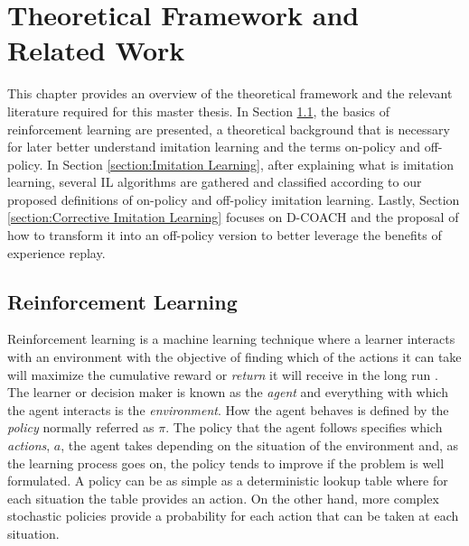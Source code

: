 \chapter{Theoretical Framework and Related Work}
\label{chapter:Theoretical Framework and Related Work}



This chapter provides an overview of the theoretical framework and the relevant literature required for this master thesis. In Section \ref{section:Reinforcement Learning}, the basics of reinforcement learning are presented, a theoretical background that is necessary for later better understand imitation learning and the terms on-policy and off-policy. In Section \ref{section:Imitation Learning}, after explaining what is imitation learning, several IL algorithms are gathered and classified according to our proposed definitions of on-policy and off-policy imitation learning. Lastly, Section \ref{section:Corrective Imitation Learning} focuses on D-COACH and the proposal of how to transform it into an off-policy version to better leverage the benefits of experience replay.




\section{Reinforcement Learning}
\label{section:Reinforcement Learning}

Reinforcement learning is a machine learning technique where a learner interacts with an environment with the objective of finding which of the actions it can take will maximize the cumulative reward or \textit{return} it will receive in the long run \cite{Sutton:1998}. The learner or decision maker is known as the \textit{agent} and everything with which the agent interacts is the \textit{environment}. How the agent behaves is defined by the \textit{policy} normally referred as $\pi$. The policy that the agent follows specifies which \textit{actions}, $a$, the agent takes depending on the situation of the environment and, as the learning process goes on, the policy tends to improve if the problem is well formulated.  A policy can be as simple as a deterministic lookup table where for each situation the table provides an action. On the other hand, more complex stochastic policies provide a probability for each action that can be taken at each situation.

